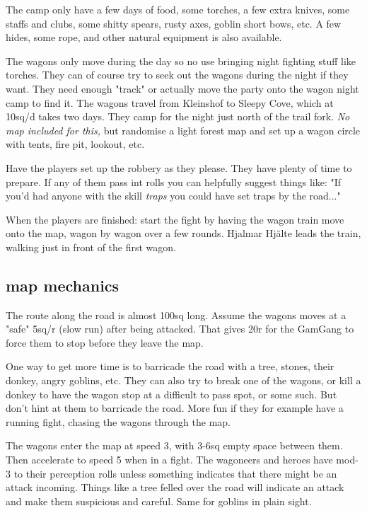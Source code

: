 The camp only have a few days of food, some torches, a few extra knives, some staffs and clubs, some shitty spears, rusty axes, goblin short bows, etc. A few hides, some rope, and other natural equipment is also available.

The wagons only move during the day so no use bringing night fighting stuff like torches. They can of course try to seek out the wagons during the night if they want. They need enough "track" or actually move the party onto the wagon night camp to find it. The wagons travel from Kleinshof to Sleepy Cove, which at 10sq/d takes two days. They camp for the night just north of the trail fork. \emph{No map included for this,} but randomise a light forest map and set up a wagon circle with tents, fire pit, lookout, etc.

Have the players set up the robbery as they please. They have plenty of time to prepare. If any of them pass int rolls you can helpfully suggest things like: "If you'd had anyone with the skill \emph{traps} you could have set traps by the road..."

When the players are finished: start the fight by having the wagon train move onto the map, wagon by wagon over a few rounds. Hjalmar Hjälte leads the train, walking just in front of the first wagon.


\subsection*{map mechanics}

The route along the road is almost 100sq long. Assume the wagons moves at a "safe" 5sq/r (slow run) after being attacked. That gives 20r for the GamGang to force them to stop before they leave the map.

One way to get more time is to barricade the road with a tree, stones, their donkey, angry goblins, etc. They can also try to break one of the wagons, or kill a donkey to have the wagon stop at a difficult to pass spot, or some such. But don't hint at them to barricade the road. More fun if they for example have a running fight, chasing the wagons through the map.

The wagons enter the map at speed 3, with 3-6sq empty space between them. Then accelerate to speed 5 when in a fight. The wagoneers and heroes have mod-3 to their perception rolls unless something indicates that there might be an attack incoming. Things like a tree felled over the road will indicate an attack and make them suspicious and careful. Same for goblins in plain sight.


